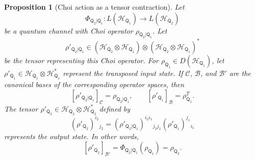 \documentclass[
    aps,
    pra,
    reprint,
    superscriptaddress,
    nofootinbib
]{revtex4-2}
\theoremstyle{definition}
\theoremstyle{plain}
\newtheorem{proposition}[theorem]{Proposition}
\begin{document}
\begin{proposition}[Choi action as a tensor contraction]
    \label{prop:choi-action-tensor-contraction}
    Let
    \begin{equation}
        \Phi_{\mathsf{Q}_{2}|\mathsf{Q}_{1}}:
        L(\mathcal{H}_{\mathsf{Q}_{1}})
        \to
        L(\mathcal{H}_{\mathsf{Q}_{2}})
    \end{equation}
    be a quantum channel with Choi operator
    $\rho_{\mathsf{Q}_{2}|\mathsf{Q}_{1}}$. Let
    \begin{equation}
        \rho'_{\mathsf{Q}_{2}|\mathsf{Q}_{1}}
        \in
        (\mathcal{H}_{\mathsf{Q}_{2}}
        \otimes\mathcal{H}_{\mathsf{Q}_{1}})
        \otimes
        (\mathcal{H}_{\mathsf{Q}_{2}}
        \otimes\mathcal{H}_{\mathsf{Q}_{1}})^{*}
    \end{equation}
    be the tensor representing this Choi operator. For
    $\rho_{\mathsf{Q}_{1}}\in
    D(\mathcal{H}_{\mathsf{Q}_{1}})$, let
    $\rho'_{\mathsf{Q}_{1}}\in
    \mathcal{H}_{\mathsf{Q}_{1}}
    \otimes\mathcal{H}_{\mathsf{Q}_{1}}^{*}$ represent the transposed
    input state. If $\mathcal{C}$, $\mathcal{B}$, and $\mathcal{B}'$
    are the canonical bases of the corresponding operator spaces, then
    \begin{equation}
        \left[
            \rho'_{\mathsf{Q}_{2}|\mathsf{Q}_{1}}
        \right]_{\mathcal{C}}
        =
        \rho_{\mathsf{Q}_{2}|\mathsf{Q}_{1}},
        \qquad
        \left[
            \rho'_{\mathsf{Q}_{1}}
        \right]_{\mathcal{B}}
        =
        \rho_{\mathsf{Q}_{1}}^{T}.
    \end{equation}
    The tensor $\rho'_{\mathsf{Q}_{2}}\in
    \mathcal{H}_{\mathsf{Q}_{2}}
    \otimes\mathcal{H}_{\mathsf{Q}_{2}}^{*}$ defined by
    \begin{equation}
        (\rho'_{\mathsf{Q}_{2}})^{i_{2}}{}_{j_{2}}
        =
        (\rho'_{\mathsf{Q}_{2}|\mathsf{Q}_{1}})
        ^{i_{2}i_{1}}{}_{j_{2}j_{1}}
        (\rho'_{\mathsf{Q}_{1}})^{j_{1}}{}_{i_{1}}
    \end{equation}
    represents the output state. In other words,
    \begin{equation}
        \left[
            \rho'_{\mathsf{Q}_{2}}
        \right]_{\mathcal{B}'}
        =
        \Phi_{\mathsf{Q}_{2}|\mathsf{Q}_{1}}
        \left(\rho_{\mathsf{Q}_{1}}\right)
        =
        \rho_{\mathsf{Q}_{2}}.
    \end{equation}
\end{proposition}
\end{document}
